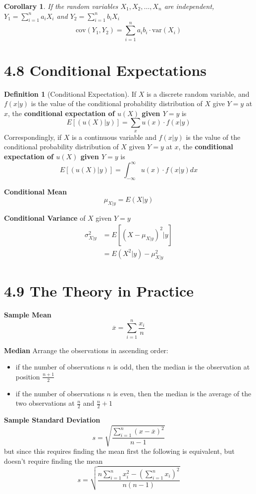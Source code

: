 \documentclass[
10pt,reqno
]{amsart}
\newtheorem{corollary}{Corollary}[section]
\theoremstyle{definition}
\newtheorem{definition}{Definition}[section]
\begin{document}
\begin{corollary}
If the random variables \(X_1, X_2,\ldots,X_n\) are independent, \(Y_1=\sum_{i=1}^n a_i X_i\) and \(Y_2=\sum_{i=1}^n b_i X_i\)
\[
\text{cov}(Y_1, Y_2)=\sum_{i=1}^n a_i b_i \cdot \text{var}(X_i)
\]
\end{corollary}

\section*{4.8 Conditional Expectations}

\begin{definition}[Conditional Expectation]
If \(X\) is a discrete random variable, and \(f(x|y)\) is the value of the conditional probability distribution of \(X\) give \(Y=y\) at \(x\), the \textbf{conditional expectation of \(u(X)\) given \(Y=y\)} is
\[
E[(u(X)|y)]=\sum_x u(x)\cdot f(x|y)
\]
Correspondingly, if \(X\) is a continuous variable and \(f(x|y)\) is the value of the conditional probability distribution of \(X\) given \(Y=y\) at \(x\), the \textbf{conditional expectation of \(u(X)\) given \(Y=y\)} is
\[
E[(u(X)|y)]=\int_{- \infty}^{\infty} u(x)\cdot f(x|y)dx
\]
\end{definition}

\textbf{Conditional Mean}
\[
\mu_{X|y}=E(X|y)
\]

\textbf{Conditional Variance}
of \(X\) given \(Y=y\)
\begin{align*}
\sigma_{X|y}^2&=E[(X - \mu_{X|y})^2|y]\\
&=E(X^2|y)-\mu_{X|y}^2
\end{align*}

\section*{4.9 The Theory in Practice}

\textbf{Sample Mean}
\[
\overline{x}=\sum_{i=1}^n \frac{x_i}{n}
\]

\textbf{Median} Arrange the observations in ascending order:
\begin{itemize}
	\item if the number of observations \(n\) is odd, then the median is the observation at position \(\frac{n+1}{2}\)
	\item if the number of observations \(n\) is even, then the median is the average of the two observations at
  \(\frac{n}{2}\) and \(\frac{n}{2} + 1\)
\end{itemize}

\textbf{Sample Standard Deviation}
\[
s=\sqrt{\frac{\sum_{i=1}^n (x-\overline{x})^2}{n-1}}
\]
but since this requires finding the mean first the following is equivalent, but doesn't require finding the mean
\[
s=\sqrt{\frac{n\sum_{i=1}^n x_i^2-(\sum_{i=1}^n x_i)^2}{n(n-1)}}
\]
\end{document}
